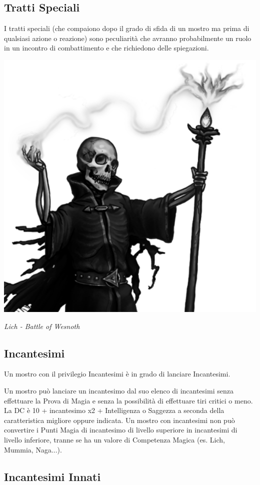\begin{multicols}{2}
\subsection{Tratti Speciali}

I tratti speciali (che compaiono dopo il grado di sfida di un mostro ma prima di qualsiasi azione o reazione) sono peculiarità che avranno probabilmente un ruolo in un incontro di combattimento e che richiedono delle spiegazioni.

\begin{center}
	\includegraphics[width=0.7\linewidth]{immagini/lich2.png}

	\textit{Lich - Battle of Wesnoth}

\end{center}

\subsection{Incantesimi}

Un mostro con il privilegio Incantesimi è in grado di lanciare Incantesimi.

Un mostro può lanciare un incantesimo dal suo elenco di incantesimi senza effettuare la Prova di Magia e senza la possibilità di effettuare tiri critici o meno. La DC è 10 + incantesimo x2 + Intelligenza o Saggezza a seconda della caratteristica migliore oppure indicata. Un mostro con incantesimi non può convertire i Punti Magia di incantesimo di livello superiore in incantesimi di livello inferiore, tranne se ha un valore di Competenza Magica (es. Lich, Mummia, Naga...).

\subsection{Incantesimi Innati}


\end{multicols}
